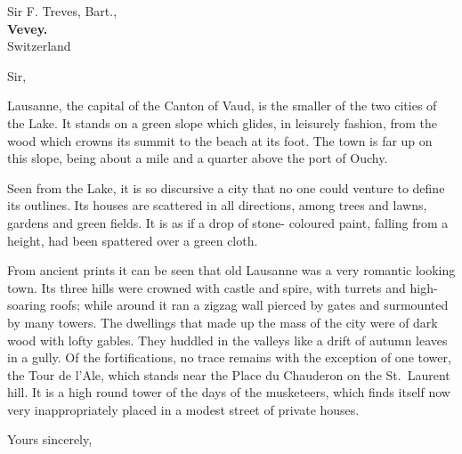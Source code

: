 \documentclass[10pt,private]{hletter}
\begin{document}
\signature{}


\date{Lausanne, le 15 septembre 2008}

\begin{letter}{Sir F. Treves, Bart.,\\
               \textbf{Vevey.}\\
               Switzerland}

\opening[\textsc{[draft]}]{Sir,}


Lausanne, the capital of the Canton of Vaud, is the smaller of the two
cities of the Lake. It stands on a green slope which glides, in
leisurely fashion, from the wood which crowns its summit to the beach
at its foot. The town is far up on this slope, being about a mile and a
quarter above the port of Ouchy.

Seen from the Lake, it is so discursive a city that no one could venture to
define its outlines. Its houses are scattered in all directions, among trees
and lawns, gardens and green fields. It is as if a drop of stone- coloured
paint, falling from a height, had been spattered over a green cloth.

From ancient prints it can be seen that old Lausanne was a very romantic
looking town. Its three hills were crowned with castle and spire, with
turrets and high- soaring roofs; while around it ran a zigzag wall pierced by
gates and surmounted by many towers. The dwellings that made up the mass of
the city were of dark wood with lofty gables. They huddled in the valleys
like a drift of autumn leaves in a gully. Of the fortifications, no trace
remains with the exception of one tower, the Tour de l'Ale, which stands near
the Place du Chauderon on the St.~Laurent hill. It is a high round tower of
the days of the musketeers, which finds itself now very inappropriately
placed in a modest street of private houses.

\closing{Yours sincerely,}

\vspace{2cm}


\end{letter}
\end{document}
